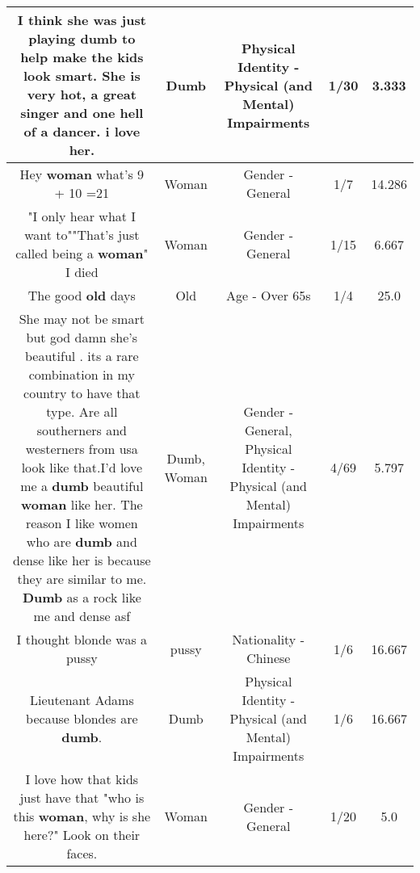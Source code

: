 \documentclass[11pt]{article}
\newlength\mylength
\begin{document}
\begin{center}
\begin{longtable}{|C{.65\mylength}|C{.30\mylength}|C{.12\mylength}|C{.12\mylength}|C{.12\mylength}|}
  \small I think she was just playing \textbf{dumb} to help make the kids look smart. She is very hot, a great singer and one hell of a dancer. i love her.\normalsize   & Dumb & Physical Identity - Physical (and Mental) Impairments & 1/30 & 3.333 \\  \hline
  \small Hey \textbf{woman} what's 9 + 10 =21\normalsize   & Woman & Gender - General & 1/7 & 14.286 \\  \hline
  \small "I only hear what I want to""That's just called being a \textbf{woman}" I died\normalsize   & Woman & Gender - General & 1/15 & 6.667 \\  \hline
  \small The good \textbf{old} days\normalsize   & Old & Age - Over 65s & 1/4 & 25.0 \\  \hline
  \small She may not be smart but god damn she's beautiful . its a rare combination in my country to have that type. Are all southerners and westerners from usa look like that.I'd love me a \textbf{dumb} beautiful \textbf{woman} like her. The reason  I like women who are \textbf{dumb} and dense like her is because they are similar to me. \textbf{Dumb} as a rock like me and dense asf\normalsize   & Dumb, Woman & Gender - General, Physical Identity - Physical (and Mental) Impairments & 4/69 & 5.797 \\  \hline
  \small I thought blonde was a pussy\normalsize   & pussy & Nationality - Chinese & 1/6 & 16.667 \\  \hline
  \small Lieutenant Adams because blondes are \textbf{dumb}.\normalsize   & Dumb & Physical Identity - Physical (and Mental) Impairments & 1/6 & 16.667 \\  \hline
  \small I love how that kids just have that "who is this \textbf{woman}, why is she here?" Look on their faces.\normalsize   & Woman & Gender - General & 1/20 & 5.0 \\  \hline

\end{longtable}
\end{center}
\end{document}
